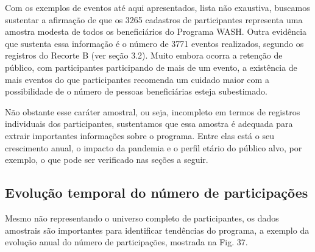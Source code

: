 \documentclass[
12pt,		%
openright,	%
twoside,  %
a4paper,			%
chapter=TITLE,		%
english,			%
french,				%
spanish,			%
brazil				%
]{USPSC-classe/USPSC}
\begin{document}
Com os exemplos de eventos at\'e aqui apresentados, lista n\~ao exaustiva, buscamos sustentar a afirma\c{c}\~ao de que os 3265 cadastros de participantes representa uma amostra modesta de todos os benefici\'arios do Programa WASH. Outra evid\^encia que sustenta essa informa\c{c}\~ao \'e o n\'umero de 3771 eventos realizados, segundo os registros do Recorte B (ver se\c{c}\~ao 3.2). Muito embora ocorra a reten\c{c}\~ao de p\'ublico, com participantes participando de mais de um evento, a exist\^encia de mais eventos do que participantes recomenda um cuidado maior com a possibilidade de o n\'umero de pessoas benefici\'arias esteja subestimado.








N\~ao obstante esse car\'ater amostral, ou seja, incompleto em termos de registros individuais dos participantes, sustentamos que essa amostra \'e adequada para extrair importantes informa\c{c}\~oes sobre o programa. Entre elas est\'a o seu crescimento anual, o impacto da pandemia e o perfil et\'ario do p\'ublico alvo, por exemplo, o que pode ser verificado nas se\c{c}\~oes a seguir.








\subsection[Evolu\c{c}\~ao temporal do n\'umero de participa\c{c}\~oes]{Evolu\c{c}\~ao temporal do n\'umero de participa\c{c}\~oes}\label{Evolu\c{c}\~ao temporal do n\'umero de participa\c{c}\~oes}
Mesmo n\~ao representando o universo completo de participantes, os dados amostrais s\~ao importantes para identificar tend\^encias do programa, a exemplo da evolu\c{c}\~ao anual do n\'umero de participa\c{c}\~oes, mostrada na Fig. 37.
\end{document}
